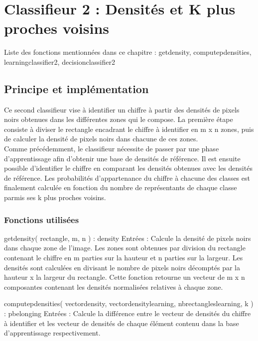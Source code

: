\chapter{Classifieur 2 : Densités et K plus proches voisins}
Liste des fonctions mentionnées dans ce chapitre : getdensity, computepdensities, learningclassifier2, decisionclassifier2

\section{Principe et implémentation}

Ce second classifieur vise à identifier un chiffre à partir des densités de pixels noirs obtenues dans les différentes zones qui le compose. La première étape consiste à diviser le rectangle encadrant le chiffre à identifier en m x n zones, puis de calculer la densité de pixels noirs dans chacune de ces zones.\\

Comme précédemment, le classifieur nécessite de passer par une phase d'apprentissage afin d'obtenir une base de densités de référence. Il est ensuite possible d'identifier le chiffre en comparant les densités obtenues avec les densités de référence. Les probabilités d'appartenance du chiffre à chacune des classes est finalement calculée en fonction du nombre de représentants de chaque classe parmis ses k plus proches voisins.

\subsection{Fonctions utilisées}

getdensity( rectangle, m, n ) : density
Entrées :
Calcule la densité de pixels noirs dans chaque zone de l'image. Les zones sont obtenues par division du rectangle contenant le chiffre en m parties sur la hauteur et n parties sur la largeur. Les densités sont calculées en divisant le nombre de pixels noirs décomptés par la hauteur x la largeur du rectangle.
Cette fonction retourne un vecteur de m x n composantes contenant les densités normalisées relatives à chaque zone.

computepdensities( vectordensity, vectordensitylearning, nbrectangleslearning, k ) : pbelonging
Entrées : 
Calcule la différence entre le vecteur de densités du chiffre à identifier et les vecteur de densités de chaque élément contenu dans la base d'apprentissage respectivement.



